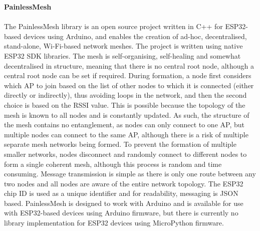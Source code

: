 \textbf{PainlessMesh}\\\\
The PainlessMesh library is an open source project written in C++ for ESP32-based devices using Arduino, and enables the creation of ad-hoc, decentralised, stand-alone, Wi-Fi-based network meshes. The project is written using native ESP32 SDK libraries. The mesh is self-organising, self-healing and somewhat decentralised in structure, meaning that there is no central root node, although a central root node can be set if required. During formation, a node first considers which AP to join based on the list of other nodes to which it is connected (either directly or indirectly), thus avoiding loops in the network, and then the second choice is based on the RSSI value. This is possible because the topology of the mesh is known to all nodes and is constantly updated. As such, the structure of the mesh contains no entanglement, as nodes can only connect to one AP, but multiple nodes can connect to the same AP, although there is a risk of multiple separate mesh networks being formed. To prevent the formation of multiple smaller networks, nodes disconnect and randomly connect to different nodes to form a single coherent mesh, although this process is random and time consuming. Message transmission is simple as there is only one route between any two nodes and all nodes are aware of the entire network topology. The ESP32 chip ID is used as a unique identifier and for readability, messaging is JSON based.
PainlessMesh is designed to work with Arduino and is available for use with ESP32-based devices using Arduino firmware, but there is currently no library implementation for ESP32 devices using MicroPython firmware. \citep{van_leeuwen_painlessmesh_2019}


